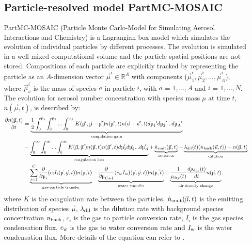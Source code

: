 \documentclass[edeposit,fullpage]{uiucthesis2009}
\begin{document}
\subsection{Particle-resolved model PartMC-MOSAIC}
PartMC-MOSAIC (Particle Monte Carlo-Model for Simulating Aerosol Interactions and Chemistry) is a Lagrangian box model which simulates the evolution of individual particles by different processes. The evolution is simulated in a well-mixed computational volume and the particle spatial positions are not stored. Compositions of each particle are explicitly tracked by representing the particle as an $A$-dimension vector $\vec{\mu}^i \in \mathbb{R}^A$ with components ($\vec{\mu}_1^i,\vec{\mu}_2^i,...,\vec{\mu}_A^i$), where $\vec{\mu}_a^i$ is the mass of species $a$ in particle $i$, with $a$ = $1,...,A$ and $i$ = $1,...,N$. The evolution for aerosol number concentration with species mass $\mu$ at time $t$, $n(\vec{\mu},t)$, is described by: 
\begin{equation}
\begin{aligned}
 \frac{\partial n(\vec{\mu},t)}{\partial t} &= \underbrace{\frac{1}{2}\int_0^{\mu_1}\int_0^{\mu_2}...\int_0^{\mu_A} K(\vec{\mu}',\vec{\mu}-\vec{\mu}')n(\vec{\mu}',t)n(\vec{u}-\vec{u}',t)d{\mu_1}'d{\mu_2}'...d{\mu_A}'}_\text{coagulation gain}\\
& - \underbrace{\int_0^\infty\int_0^\infty...\int_0^\infty K(\vec{\mu},\vec{\mu}')n(\vec{\mu},t)n(\vec{\mu}',t)d\mu_1'd\mu_2'...d\mu_A' }_\text{coagulation loss} + \underbrace{\dot{n}_{\rm emit}(\vec{\mu},t)}_\text{emission} + \underbrace{\lambda_{\rm dil}(t)(n_{\rm back}(\vec{u},t))-n(\vec{\mu},t)}_\text{dilution}\\
&-\underbrace{\sum_{i=1}^{C}\frac{\partial}{\partial\mu_i}(c_iI_i(\vec{\mu},\vec{g},t))n(\vec{\mu,t})}_\text{gas-particle transfer} - \underbrace{\frac{\partial}{\partial\mu_{C+1}}(c_wI_w)(\vec{\mu},\vec{g},t))n(\vec{\mu,t})}_\text{water transfer} + \underbrace{\frac{1}{\rho_{\rm dry}(t)}\frac{d\rho_{\rm dry}(t)}{dt}n(\vec{\mu},t)}_\text{air density change},
\end{aligned}
\label{eq:partmc}
\end{equation}
where $K$ is the coagulation rate between the particles, $\dot{n}_{\rm emit}(\vec{\mu},t)$ is the emitting distribution of species $\vec{\mu}$, $\lambda_{\rm dil}$ is the dilution rate with background species concentration $n_{\rm back}$, $c_i$ is the gas to particle conversion rate, $I_i$ is the gas species condensation flux, $c_{\rm w}$ is the gas to water conversion rate and $I_{\rm w}$ is the water condensation flux. More details of the equation can refer to \citet{Riemer2009}.
\end{document}
